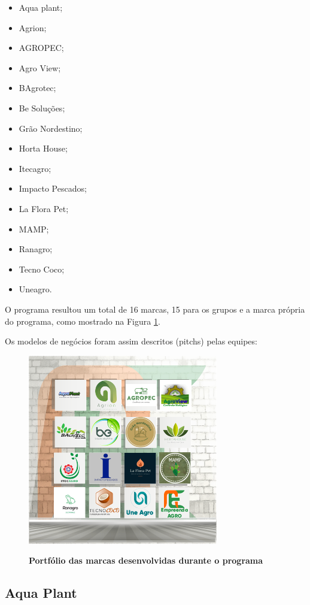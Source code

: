 \begin{multicols}{3}
\centering
    \begin{itemize}
\item { Aqua plant;}
\item { Agrion;}
\item { AGROPEC;}
\item { Agro View;}
\item { BAgrotec;}
\item { Be Soluções;}
\item { Grão Nordestino;}
\item { Horta House;}
\item { Itecagro;}
\item { Impacto Pescados;}
\item { La Flora Pet;}
\item { MAMP;}
\item { Ranagro;}
\item { Tecno Coco;}
\item { Uneagro.}
\end{itemize}
\end{multicols}

O programa resultou um total de 16 marcas, 15 para os grupos e a marca própria do programa, como mostrado na Figura \ref{fig_marcas}.

Os modelos de negócios foram assim descritos (pitchs) pelas equipes:
\begin{figure}[H]
\centering
\caption{\textbf{Portfólio das marcas desenvolvidas durante o programa}}
\includegraphics[scale=2]{Imagens/portfolio.png}
\label{fig_marcas}
\end{figure}


\subsection{Aqua Plant}

